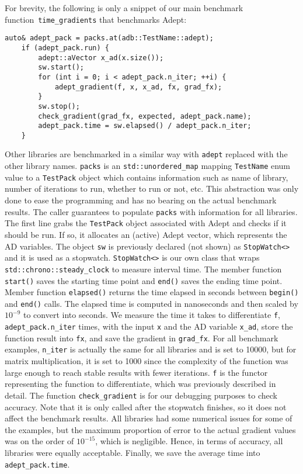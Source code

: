 For brevity, the following is only a snippet of our main
benchmark function~\verb|time_gradients| that benchmarks Adept:
\begin{lstlisting}[style=customcpp]
    auto& adept_pack = packs.at(adb::TestName::adept);
    if (adept_pack.run) {
        adept::aVector x_ad(x.size());
        sw.start();
        for (int i = 0; i < adept_pack.n_iter; ++i) {
            adept_gradient(f, x, x_ad, fx, grad_fx);
        }
        sw.stop();
        check_gradient(grad_fx, expected, adept_pack.name);
        adept_pack.time = sw.elapsed() / adept_pack.n_iter;
    }
\end{lstlisting}
Other libraries are benchmarked in a similar way with \verb|adept| replaced with the other library names.
\verb|packs| is an \verb|std::unordered_map| mapping \verb|TestName| enum value to a \verb|TestPack| object
which contains information such as name of library, number of iterations to run, whether to run or not, etc.
This abstraction was only done to ease the programming and has no bearing on the actual benchmark results.
The caller guarantees to populate \verb|packs| with information for all libraries.
The first line grabs the \verb|TestPack| object associated with Adept and checks if it should be run.
If so, it allocates an (active) Adept vector, which represents the AD variables.
The object \verb|sw| is previously declared (not shown) as \verb|StopWatch<>| and it is used as a stopwatch.
\verb|StopWatch<>| is our own class that wraps \verb|std::chrono::steady_clock| to measure interval time.
The member function \verb|start()| saves the starting time point and \verb|end()| saves the ending time point.
Member function \verb|elapsed()| returns the time elapsed in seconds between \verb|begin()| and \verb|end()| calls.
The elapsed time is computed in nanoseconds and then scaled by $10^{-9}$ to convert into seconds.
We measure the time it takes to differentiate \verb|f|, \verb|adept_pack.n_iter| times,
with the input \verb|x| and the AD variable \verb|x_ad|,
store the function result into \verb|fx|, and save the gradient in \verb|grad_fx|.
For all benchmark examples, \verb|n_iter| is actually the same for all libraries and is set to 10000,
but for matrix multiplication, it is set to 1000 
since the complexity of the function was large enough to reach stable results with fewer iterations.
\verb|f| is the functor representing the function to differentiate,
which was previously described in detail.
The function \verb|check_gradient| is for our debugging purposes to check accuracy.
Note that it is only called after the stopwatch finishes, so it does not affect the benchmark results.
All libraries had some numerical issues for some of the examples,
but the maximum proportion of error to the actual gradient values was on the order of $ 10^{-15}$, which is negligible.
Hence, in terms of accuracy, all libraries were equally acceptable.
Finally, we save the average time into \verb|adept_pack.time|.

